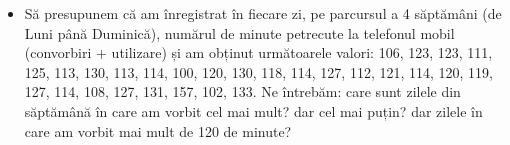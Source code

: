 \documentclass[]{article}
\newenvironment{Shaded}{\begin{snugshade}}{\end{snugshade}}
\newcommand{\KeywordTok}[1]{\textcolor[rgb]{0.13,0.29,0.53}{\textbf{#1}}}
\newcommand{\DataTypeTok}[1]{\textcolor[rgb]{0.13,0.29,0.53}{#1}}
\newcommand{\DecValTok}[1]{\textcolor[rgb]{0.00,0.00,0.81}{#1}}
\newcommand{\FloatTok}[1]{\textcolor[rgb]{0.00,0.00,0.81}{#1}}
\newcommand{\StringTok}[1]{\textcolor[rgb]{0.31,0.60,0.02}{#1}}
\newcommand{\OtherTok}[1]{\textcolor[rgb]{0.56,0.35,0.01}{#1}}
\newcommand{\OperatorTok}[1]{\textcolor[rgb]{0.81,0.36,0.00}{\textbf{#1}}}
\newcommand{\NormalTok}[1]{#1}
\newenvironment{frshaded*}{%
  \def\FrameCommand{\fboxrule=\FrameRule\fboxsep=\FrameSep \fcolorbox{framecolor}{shadecolor1}}%
  \MakeFramed {\advance\hsize-\width \FrameRestore}}%
{\endMakeFramed}
\newenvironment{rmdblock}[1]
  {\begin{frshaded*}
  \begin{itemize}
  \renewcommand{\labelitemi}{
    \raisebox{-.7\height}[0pt][0pt]{
      {\setkeys{Gin}{width=2em,keepaspectratio}\texttt{[image: images/icons/\#1]}}
    }
  }
  \item
  }
  {
  \end{itemize}
  \end{frshaded*}
  }
\newenvironment{rmdexercise}
  {\begin{rmdblock}{exercise}}
  {\end{rmdblock}}
\begin{document}
\begin{Shaded}
\end{Shaded}

\begin{rmdexercise}
Să presupunem că am înregistrat în fiecare zi, pe parcursul a 4
săptămâni (de Luni până Duminică), numărul de minute petrecute la
telefonul mobil (convorbiri + utilizare) și am obținut următoarele
valori: 106, 123, 123, 111, 125, 113, 130, 113, 114, 100, 120, 130, 118,
114, 127, 112, 121, 114, 120, 119, 127, 114, 108, 127, 131, 157, 102,
133. Ne întrebăm: care sunt zilele din săptămână în care am vorbit cel
mai mult? dar cel mai puțin? dar zilele în care am vorbit mai mult de
120 de minute?
\end{rmdexercise}
\end{document}
